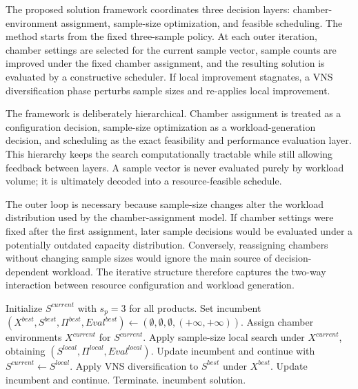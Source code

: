 \documentclass[11pt]{article}
\begin{document}
The proposed solution framework coordinates three decision layers: chamber-environment assignment, sample-size optimization, and feasible scheduling. The method starts from the fixed three-sample policy. At each outer iteration, chamber settings are selected for the current sample vector, sample counts are improved under the fixed chamber assignment, and the resulting solution is evaluated by a constructive scheduler. If local improvement stagnates, a VNS diversification phase perturbs sample sizes and re-applies local improvement.

The framework is deliberately hierarchical. Chamber assignment is treated as a configuration decision, sample-size optimization as a workload-generation decision, and scheduling as the exact feasibility and performance evaluation layer. This hierarchy keeps the search computationally tractable while still allowing feedback between layers. A sample vector is never evaluated purely by workload volume; it is ultimately decoded into a resource-feasible schedule.

The outer loop is necessary because sample-size changes alter the workload distribution used by the chamber-assignment model. If chamber settings were fixed after the first assignment, later sample decisions would be evaluated under a potentially outdated capacity distribution. Conversely, reassigning chambers without changing sample sizes would ignore the main source of decision-dependent workload. The iterative structure therefore captures the two-way interaction between resource configuration and workload generation.

\begin{algorithm}[H]
\caption{Integrated TCSSOP heuristic}
\label{alg:integrated_short}
\begin{algorithmic}[1]
\State Initialize \(S^{current}\) with \(s_p=3\) for all products.
\State Set incumbent \((X^{best},S^{best},\Pi^{best},Eval^{best})\leftarrow(\emptyset,\emptyset,\emptyset,(+\infty,+\infty))\).
    \State Assign chamber environments \(X^{current}\) for \(S^{current}\).
    \State Apply sample-size local search under \(X^{current}\), obtaining \((S^{local},\Pi^{local},Eval^{local})\).
        \State Update incumbent and continue with \(S^{current}\leftarrow S^{local}\).
    \Else
        \State Apply VNS diversification to \(S^{best}\) under \(X^{best}\).
            \State Update incumbent and continue.
        \Else
            \State Terminate.
        \EndIf
    \EndIf
\EndFor
\State \Return incumbent solution.
\end{algorithmic}
\end{algorithm}
\end{document}
